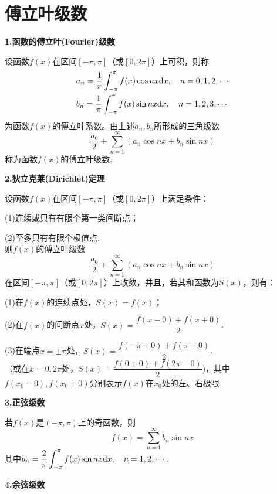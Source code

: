 \section{傅立叶级数}
\textbf{1.函数的傅立叶(Fourier)级数}

设函数$f(x)$在区间$[-\pi,\pi]$（或$[0,2\pi]$）上可积，则称
\begin{align*}
    & a_n=\dfrac{1}{\pi}\int_{-\pi}^\pi f(x)\cos nx\mathrm{d} x, \quad n=0,1,2,\cdots \\
    & b_n=\dfrac{1}{\pi}\int_{-\pi}^\pi f(x)\sin nx\mathrm{d} x, \quad n=1,2,3,\cdots
\end{align*}
为函数$f(x)$的傅立叶系数。由上述$a_n,b_n$所形成的三角级数
\begin{equation*}
    \dfrac{a_0}{2}+\sum_{n=1}^\infty(a_n\cos nx+b_n\sin nx)
\end{equation*}
称为函数$f(x)$的傅立叶级数.

\textbf{2.狄立克莱(Dirichlet)定理}

设函数$f(x)$在区间$[-\pi,\pi]$（或$[0,2\pi]$）上满足条件：

(1)连续或只有有限个第一类间断点；

(2)至多只有有限个极值点.\\
则$f(x)$的傅立叶级数
\begin{equation*}
    \dfrac{a_0}{2}+\sum_{n=1}^\infty(a_n\cos nx+b_n\sin nx)
\end{equation*}
在区间$[-\pi,\pi]$（或$[0,2\pi]$）上收敛，并且，若其和函数为$S(x)$，则有：

(1)在$f(x)$的连续点处，$S(x)=f(x)$；
\vspace{2mm}

(2)在$f(x)$的间断点$x$处，$S(x)=\dfrac{f(x-0)+f(x+0)}{2}$.
\vspace{2mm}

(3)在端点$x=\pm\pi$处，$S(x)=\dfrac{f(-\pi+0)+f(\pi-0)}{2}$.\\\vspace{2mm}
（或在$x=0,2\pi$处，$S(x)=\dfrac{f(0+0)+f(2\pi-0)}{2}$)，其中$f(x_0-0),f(x_0+0)$分别表示$f(x)$在$x_0$处的左、右极限

\textbf{3.正弦级数}

若$f(x)$是$(-\pi,\pi)$上的奇函数，则
\begin{equation*}
    f(x)=\sum_{n=1}^\infty b_n\sin nx
\end{equation*}
其中$b_n=\displaystyle\dfrac{2}{\pi}\int_{-\pi}^\pi f(x)\sin nx\mathrm{d} x, \quad n=1,2,\cdots$.

\textbf{4.余弦级数}

